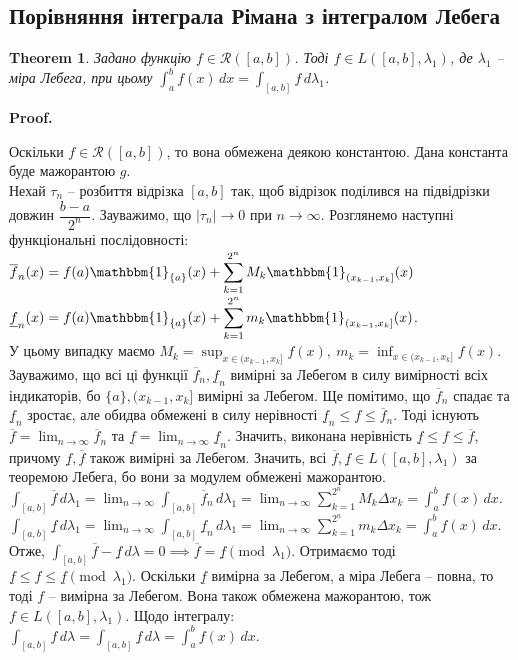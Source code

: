 \documentclass[a4paper, 10pt]{article}
\makeatletter
\theoremstyle{theoremdd}
\newtheorem{theorem}{Theorem}[subsection]
\renewenvironment{proof}[1][Proof.\\]{\par
\pushQED{\hfill \qed}%
\normalfont \topsep6\p@\@plus6\p@\relax
\trivlist
\item\relax
{\bfseries
#1\@addpunct{.}}\hspace\labelsep\ignorespaces
}{%
\popQED\endtrivlist\@endpefalse
}
\makeatother
\begin{document}
\subsection{Порівняння інтеграла Рімана з інтегралом Лебега}
\begin{theorem}
Задано функцію $f \in \mathcal{R}([a,b])$. Тоді $f \in L([a,b],\lambda_1)$, де $\lambda_1$ -- міра Лебега, при цьому $\displaystyle\int_a^b f(x)\,dx = \int_{[a,b]} f\,d\lambda_1$.
\end{theorem}

\begin{proof}
Оскільки $f \in \mathcal{R}([a,b])$, то вона обмежена деякою константою. Дана константа буде мажорантою $g$.\\
Нехай $\tau_n$ -- розбиття відрізка $[a,b]$ так, щоб відрізок поділився на  підвідрізки довжин $\dfrac{b-a}{2^n}$. Зауважимо, що $|\tau_n| \to 0$ при $n \to \infty$. Розглянемо наступні функціональні послідовності:\\
$\overline{f}_n(x) = f(a) \mathbbm{1}_{\{a\}}(x) + \displaystyle\sum_{k=1}^{2^n} M_k \mathbbm{1}_{(x_{k-1},x_k]}(x)$ \qquad $\underline{f}_n(x) = f(a) \mathbbm{1}_{\{a\}}(x) + \displaystyle\sum_{k=1}^{2^n} m_k \mathbbm{1}_{(x_{k-1},x_k]}(x)$.\\
У цьому випадку маємо $M_k = \displaystyle\sup_{x \in (x_{k-1},x_k]} f(x),\ m_k = \displaystyle\inf_{x \in (x_{k-1},x_k]} f(x)$.\\
Зауважимо, що всі ці функції $\overline{f}_n, \underline{f}_n$ вимірні за Лебегом в силу вимірності всіх індикаторів, бо $\{a\}, (x_{k-1},x_k]$ вимірні за Лебегом. Ще помітимо, що $\overline{f}_n$ спадає та $\underline{f}_n$ зростає, але обидва обмежені в силу нерівності $\underline{f}_n \leq f \leq \overline{f}_n$. Тоді існують $\overline{f} = \displaystyle\lim_{n \to \infty} \overline{f}_n$ та $\underline{f} = \displaystyle\lim_{n \to \infty} \underline{f}_n$. Значить, виконана нерівність $\underline{f} \leq f \leq \overline{f}$, причому $\underline{f}, \overline{f}$ також вимірні за Лебегом. Значить, всі $\overline{f}, \underline{f} \in L([a,b],\lambda_1)$ за теоремою Лебега, бо вони за модулем обмежені мажорантою.\\
$\displaystyle\int_{[a,b]} \overline{f}\,d\lambda_1 = \lim_{n \to \infty} \int_{[a,b]} \overline{f}_n\,d\lambda_1 = \lim_{n \to \infty} \sum_{k=1}^{2^n} M_k \Delta x_k = \int_a^b f(x)\,dx$.\\
$\displaystyle\int_{[a,b]} \underline{f}\,d\lambda_1 = \lim_{n \to \infty} \int_{[a,b]} \underline{f}_n\,d\lambda_1 = \lim_{n \to \infty} \sum_{k=1}^{2^n} m_k \Delta x_k = \int_a^b f(x)\,dx$.\\
Отже, $\displaystyle\int_{[a,b]} \overline{f} - \underline{f}\,d\lambda = 0 \implies \overline{f} = \underline{f} \pmod {\lambda_1}$. Отримаємо тоді $\underline{f} \leq f \leq \underline{f} \pmod {\lambda_1}$. Оскільки $\underline{f}$ вимірна за Лебегом, а міра Лебега -- повна, то тоді $f$ -- вимірна за Лебегом. Вона також обмежена мажорантою, тож $f \in L([a,b],\lambda_1)$. Щодо інтегралу:\\
$\displaystyle\int_{[a,b]} f\,d\lambda = \int_{[a,b]} \underline{f}\,d\lambda = \int_a^b f(x)\,dx$.
\end{proof}
\end{document}

